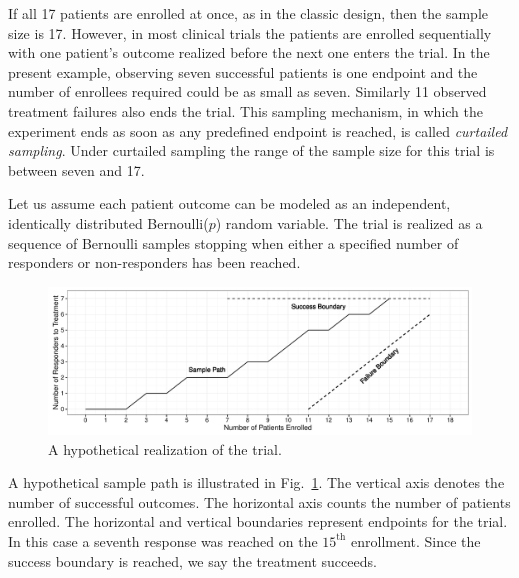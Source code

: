 \documentclass[review]{elsarticle}
\begin{document}
If all 17 patients are enrolled at once, as in the classic
design, then the sample size is 17. However, in most clinical trials the
patients are enrolled sequentially with one patient's outcome realized
before the next one enters the trial. In the present example, observing seven
successful patients is one endpoint and the number of enrollees required
could be as small as seven. Similarly 11
observed treatment failures also ends the trial. This sampling mechanism, in
which the experiment ends as soon as any predefined endpoint is reached, is
called {\em curtailed sampling}. Under curtailed sampling the range of the
sample size for this trial is between seven and 17.

Let us assume each patient outcome can be modeled as an independent,
identically distributed Bernoulli($p$) random variable. The trial is realized
as a sequence of Bernoulli samples stopping when either a
specified number of responders or non-responders has been reached. 

\begin{figure}[bp!]
\includegraphics[width=\textwidth]{KanePlot.pdf}
\caption{
A hypothetical realization of the trial.
}
\label{fig:kane_viz}
\end{figure}

A hypothetical sample path is illustrated in Fig.~\ref{fig:kane_viz}.
The vertical axis denotes the number of
successful outcomes. The horizontal axis counts the number of patients 
enrolled. The horizontal and vertical boundaries represent
endpoints for the trial. In this case a seventh response was reached on
the $15^{\text{th}}$ enrollment.
Since the success boundary is reached, we say the treatment succeeds.

\end{document}
